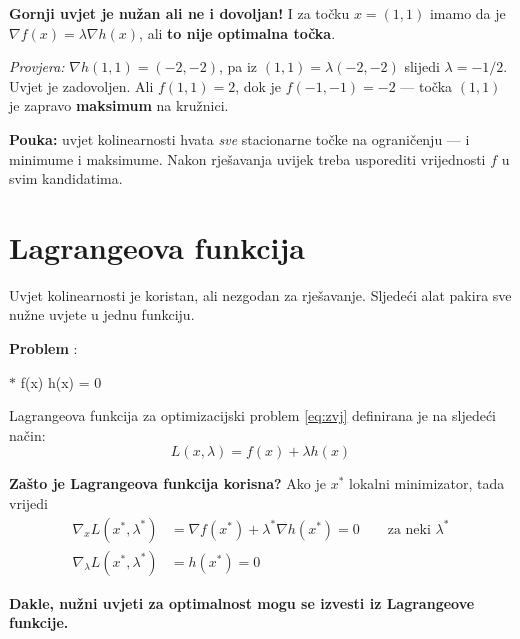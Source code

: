 \begin{napomena}
\textbf{Gornji uvjet je nužan ali ne i dovoljan!} I za točku $x = (1,1)$ imamo
da je $\nabla f(x) = \lambda\nabla h(x)$, ali \textbf{to nije optimalna točka}.

\emph{Provjera:} $\nabla h(1,1) = (-2,-2)$, pa iz $(1,1) = \lambda(-2,-2)$
slijedi $\lambda = -1/2$. Uvjet je zadovoljen. Ali $f(1,1) = 2$, dok je
$f(-1,-1) = -2$ --- točka $(1,1)$ je zapravo \textbf{maksimum} na kružnici.

\textbf{Pouka:} uvjet kolinearnosti hvata \emph{sve} stacionarne točke na
ograničenju --- i minimume i maksimume. Nakon rješavanja uvijek treba usporediti
vrijednosti $f$ u svim kandidatima.
\end{napomena}

\section{Lagrangeova funkcija}
\label{sec:lagrange}

Uvjet kolinearnosti je koristan, ali nezgodan za rješavanje. Sljedeći alat
pakira sve nužne uvjete u jednu funkciju.

\textbf{Problem} :
\begin{jednadzba}{$*$}
\label{eq:zvj}
\min f(x) \quad{}\quad h(x) = 0
\end{jednadzba}

\begin{definicija}
Lagrangeova funkcija za optimizacijski problem \eqref{eq:zvj} definirana je na
sljedeći način:
\[
L(x, \lambda) = f(x) + \lambda h(x)
\]
\end{definicija}

\textbf{Zašto je Lagrangeova funkcija korisna?}  Ako je $x^{*}$ lokalni
minimizator, tada vrijedi
\begin{align}
\nabla_x L(x^{*}, \lambda^{*})
  &= \nabla f(x^{*}) + \lambda^{*}\nabla h(x^{*}) = 0
  \qquad\text{za neki } \lambda^{*} \\
\nabla_\lambda L(x^{*}, \lambda^{*}) &= h(x^{*}) = 0
\end{align}

\textbf{Dakle, nužni uvjeti za optimalnost mogu se izvesti iz Lagrangeove
funkcije.}

